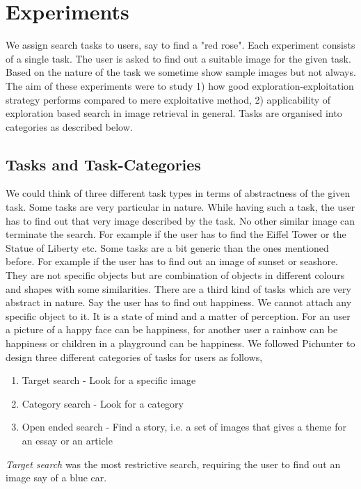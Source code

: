\documentclass[english]{tktltiki}
\begin{document}
\section{Experiments}

We assign search tasks to users, say to find a "red rose". Each experiment consists of a single task. The user is asked to find out a suitable image for the given task. Based on the nature of the task we sometime show sample images but not always. The aim of these experiments were to study 1) how good exploration-exploitation strategy performs compared to mere exploitative method, 2) applicability of exploration based search in image retrieval in general. Tasks are organised into categories as described below.

\subsection{Tasks and Task-Categories}

 We could think of three different task types in terms of abstractness of the given task. Some tasks are very particular in nature. While having such a task, the user has to find out that very image described by the task. No other similar image can terminate the search. For example if the user has to find the Eiffel Tower or the Statue of Liberty etc. Some tasks are a bit generic than the ones mentioned before. For example if the user has to find out an image of sunset or seashore. They are not specific objects but are combination of objects in different colours and shapes with some similarities. There are a third kind of tasks which are very abstract in nature. Say the user has to find out happiness. We cannot attach any specific object to it. It is a state of mind and a matter of perception. For an user a picture of a happy face can be happiness, for another user a rainbow can be happiness or children in a playground can be happiness. We followed Pichunter \cite{pichunter} to design three different categories of tasks for users as follows,

\begin{enumerate}
  \item Target search - Look for a specific image
  \item Category search - Look for a category
  \item Open ended search - Find a story, i.e. a set of images that gives a theme for an essay or an article
\end{enumerate}

\textit{Target search} was the most restrictive search, requiring the user to find out an image say of a blue car.
\end{document}
